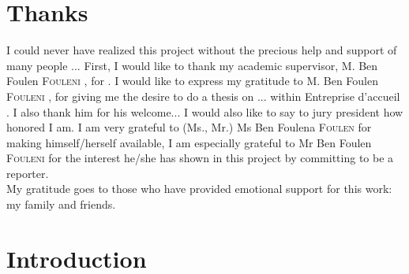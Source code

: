 \documentclass[a4paper, oneside, english, 12pt, final]{extreport}
\newcommand{\studyDepartment} {%
  Entreprise d'accueil %
}
\newcommand{\juryMemberOne} {%
  Ms Ben Foulena \textsc{Foulen}%
}
\newcommand{\juryMemberTwo} {%
  Mr Ben Foulen \textsc{Fouleni}%
}
\newcommand{\juryMemberThree} {%
	M. Ben Foulen \textsc{Fouleni}%
}
\newcommand{\juryMemberFour} {%
	M. Ben Foulen \textsc{Fouleni}%
}
\begin{document}
\chapter*{Thanks}
\thispagestyle{empty}

I could never have realized this project without the precious help and support of many people ... First, I would like to thank my academic supervisor, \juryMemberFour{}, for . I would like to express my gratitude to \juryMemberThree{}, for giving me the desire to do a thesis on ... within \studyDepartment. I also thank him for his welcome... I would also like to say to jury president how honored I am. I am very grateful to (Ms., Mr.) \juryMemberOne{} for making himself/herself available, I am especially grateful to \juryMemberTwo{} for the interest he/she has shown in this project by committing to be a reporter. \\

My gratitude goes to those who have provided emotional support for this work: my family and friends.  



\tableofcontents
{}
\cleardoublepage%

\listoffigures
\cleardoublepage%

\listoftables
\cleardoublepage

\listofalgorithms
{}
\cleardoublepage
    








\chapter*{Introduction}
\label{chap:general_intorduction}
%
\end{document}
